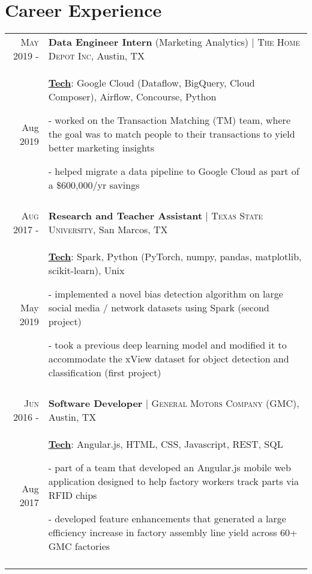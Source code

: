 \documentclass[a4paper,10pt]{article}
\begin{document}
	\section{Career Experience}
	\begin{tabular}{r|p{12cm}}
		
		\textsc{May 2019 -} & \textbf{Data Engineer Intern} (Marketing Analytics) | \textsc{The Home Depot Inc}, Austin, TX \\
		Aug 2019 & \small{
			\textbf{\underline{Tech}}: Google Cloud (Dataflow, BigQuery, Cloud Composer), Airflow, Concourse, Python}
		
		\tiny{
			\vphantom{a}
		}
		
		\small{
			- worked on the Transaction Matching (TM) team, where the goal was to match people to their transactions to yield better marketing insights
			
			- helped migrate a data pipeline to Google Cloud as part of a \$600,000/yr savings } \\
		\multicolumn{2}{c}{} \\
		
		\textsc{Aug 2017 -} & \textbf{Research and Teacher Assistant} | \textsc{Texas State University}, San Marcos, TX \\
		May 2019 & \small{
			\textbf{\underline{Tech}}: Spark, Python (PyTorch, numpy, pandas, matplotlib, scikit-learn), Unix
		}
		
		\tiny{
			\vphantom{a}
		}
		
		\small{
			
			- implemented a novel bias detection algorithm on large social media / network datasets using Spark (second project)
			
			- took a previous deep learning model and modified it to accommodate the xView dataset for object detection and classification (first project)
		}
		\\
		\multicolumn{2}{c}{} \\
		
		\textsc{Jun 2016 -} & \textbf{Software Developer} | \textsc{General Motors Company (GMC)}, Austin, TX \\
		Aug 2017 & \small{
			\textbf{\underline{Tech}}: Angular.js, HTML, CSS, Javascript, REST, SQL}
		
		\tiny{
			\vphantom{a}
		}
		
		\small{
			- part of a team that developed an Angular.js mobile web application designed to help factory workers track parts via RFID chips
			
			- developed feature enhancements that generated a large efficiency increase in factory assembly line yield across 60+ GMC factories 
		} \\
		\multicolumn{2}{c}{} \\
	\end{tabular}
\end{document}
